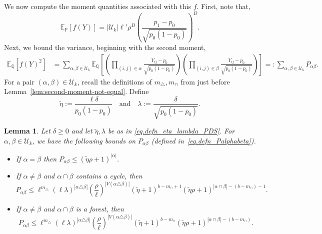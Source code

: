 \documentclass[11pt, letterpaper]{article}
\newtheorem{lemma}[theorem]{Lemma}
\numberwithin{equation}{section}
\newcommand{\E}{\mathbb{E}}
\newcommand{\PP}{\mathbb{P}}
\newcommand{\QQ}{\mathbb{Q}}
\begin{document}
We now compute the moment quantities associated with this $f$. First, note that,
\begin{equation}\label{eq.ExpForPDS}
    \E_\PP[f(Y)]=|\mathcal U_k|\ell' \rho^D \left(\frac{p_1-p_0}{\sqrt{p_0(1-p_0)}}\right)^D.
\end{equation}
Next, we bound the variance, beginning with the second moment,
\begin{align}\label{eq.defn_Palphabeta}
\E_\QQ[f(Y)^2]&=\sum_{\alpha,\beta\in\mathcal U_k} \E_\QQ\left[\left(\prod_{(i,j)\in \alpha}\frac{Y_{ij}-p_0}{\sqrt{p_0(1-p_0)}}\right)\left(\prod_{(i,j)\in \beta}\frac{Y_{ij}-p_0}{\sqrt{p_0(1-p_0)}}\right)\right]=:\sum_{\alpha,\beta \in \mathcal{U}_k} P_{\alpha\beta}.
\end{align}
For a pair $(\alpha,\beta) \in \mathcal{U}_k$, recall the definitions of $m_\triangle, m_\cap$ from just before Lemma~\ref{lem:second-moment-not-equal}.
Define
\begin{equation}\label{eq.defn_eta_lambda_PDS}
    \tilde\eta:=\frac{\ell\delta}{p_0(1-p_0)} \quad \mathrm{and}\quad \lambda:=\frac{\delta}{\sqrt{p_0(1-p_0)}}.
\end{equation}

\begin{lemma}\label{lem:pds-second-moment}Let $\delta\geq 0$ and let $\tilde\eta, \lambda$ be as in \eqref{eq.defn_eta_lambda_PDS}.
For $\alpha,\beta \in \mathcal{U}_k$, we have the following bounds on $P_{\alpha\beta}$ (defined in~\eqref{eq.defn_Palphabeta}). 
\begin{itemize}
    \item If $\alpha =\beta$ then $P_{\alpha\beta}\leq(\tilde\eta\rho+1)^{|\alpha|}$.
    \item If $\alpha \neq \beta$ and $\alpha \cap \beta$  contains a cycle, then \begin{equation*}
        P_{\alpha\beta}\leq \ell^{m_\triangle}(\ell\lambda)^{|\alpha \triangle \beta|}
 \left(\frac{\rho}{\ell}\right)^{|V(\alpha \triangle \beta)|}
 (\tilde\eta + 1)^{b-m_\cap+1}
 (\tilde\eta \rho + 1)^{|\alpha \cap \beta| - (b - m_\cap)-1}.
    \end{equation*}
    \item If $\alpha \neq \beta$ and $\alpha \cap \beta$ is a forest, then
    \begin{equation*}
        P_{\alpha\beta}\leq \ell^{m_\triangle}(\ell\lambda)^{|\alpha \triangle \beta|}
 \left(\frac{\rho}{\ell}\right)^{|V(\alpha \triangle \beta)|}
 (\tilde\eta + 1)^{b-m_\cap}
 (\tilde\eta \rho + 1)^{|\alpha \cap \beta| - (b - m_\cap)}.
    \end{equation*}
\end{itemize}
\end{lemma}
\end{document}
